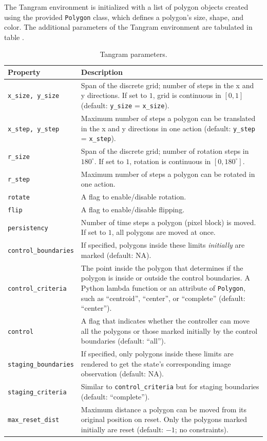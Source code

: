 The Tangram environment is initialized with a list of polygon objects created using the provided \texttt{Polygon} class, which defines a polygon's size, shape, and color.
The additional parameters of the Tangram environment are tabulated in table .
\begin{table}[H]
    \centering
    \begin{tabularx}{\textwidth}{C{3.9cm} L}
        \hline
        Property & Description\\
        \hline
        \texttt{x\_size, y\_size} & Span of the discrete grid; number of steps in the x and y directions. If set to \(1\), grid is continuous in \([0, 1]\) (default: \texttt{y\_size} = \texttt{x\_size}).\\
        \texttt{x\_step, y\_step} & Maximum number of steps a polygon can be translated in the x and y directions in one action (default: \texttt{y\_step} = \texttt{x\_step}).\\
        \texttt{r\_size} & Span of the discrete grid; number of rotation steps in \(180^\circ\). If set to \(1\), rotation is continuous in \([0, 180^\circ]\).\\
        \texttt{r\_step} & Maximum number of steps a polygon can be rotated in one action.\\
        \texttt{rotate} & A flag to enable/disable rotation.\\
        \texttt{flip} & A flag to enable/disable flipping.\\
        \texttt{persistency} & Number of time steps a polygon (pixel block) is moved. If set to \(1\), all polygons are moved at once.\\
        \texttt{control\_boundaries} & If specified, polygons inside these limits \emph{initially} are marked (default: NA).\\
        \texttt{control\_criteria} & The point inside the polygon that determines if the polygon is inside or outside the control boundaries. A Python lambda function or an attribute of \texttt{Polygon}, such as ``centroid'', ``center'', or ``complete'' (default: ``center'').\\
        \texttt{control} & A flag that indicates whether the controller can move all the polygons or those marked initially by the control boundaries (default: ``all'').\\
        \texttt{staging\_boundaries} & If specified, only polygons inside these limits are rendered to get the state's corresponding image observation (default: NA).\\
        \texttt{staging\_criteria} & Similar to \texttt{control\_criteria} but for staging boundaries (default: ``complete'').\\
        \texttt{max\_reset\_dist} & Maximum distance a polygon can be moved from its original position on reset. Only the polygons marked initially are reset (default: \(-1\); no constraints).\\
        \hline
    \end{tabularx}
    \caption{Tangram parameters.}
    \label{tab:tangram-params}
\end{table}

